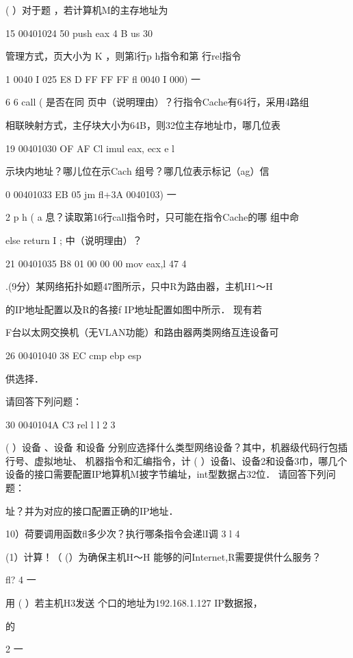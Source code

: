 {    (   ）对于题  ，若计算机M的主存地址为

    15 00401024    50     push  eax    4  B    us    30

    管理方式，页大小为  K ，则第l行p h指令和第   行rel指令

    1  0040 I 025    E8 D  FF FF FF     fl  0040 I 000)    一

    6     6     call     (     是否在同  页中（说明理由）？行指令Cache有64行，采用4路组

    相联映射方式，主仔块大小为64B，则32位主存地址巾，哪几位表

    19 00401030    OF AF Cl     imul  eax, ecx    e    l

    示块内地址？哪儿位在示Cach 组号？哪几位表示标记（ag）信

    0 00401033    EB 05     jm   fl+3A   0040103)    一

    2    p     h (    a    息？读取第16行call指令时，只可能在指令Cache的哪  组中命

    else return I ;    中（说明理由）？

    21 00401035    B8 01 00 00 00 mov  eax,l     47    4

    .(9分）某网络拓扑如题47图所示，只中R为路由器，主机H1～H

    的IP地址配置以及R的各接f IP地址配置如图中所示． 现有若

    F台以太网交换机（无VLAN功能）和路由器两类网络互连设备可

    26 00401040     38 EC     cmp   ebp esp

    供选择．

    请回答下列问题：

    30 0040104A    C3     rel     l     l    2    3

    ( ）设备 、设备  和设备  分别应选择什么类型网络设备？其中，机器级代码行包插行号、虚拟地址、 机器指令和汇编指令，计    ( ）设备l、设备2和设备3巾，哪几个设备的接口需要配置IP地算机M披字节编址，int型数据占32位． 请回答下列问题：

    址？并为对应的接口配置正确的IP地址．

    10）荷要调用函数fl多少次？执行哪条指令会递lI调    3    l   4

(1）计算！（    (）为确保主机H～H 能够的问Internet,R需要提供什么服务？

    fl?    4    一

    用    ( ）若主机H3发送  个口的地址为192.168.1.127   IP数据报，

    的

 2    一

}
